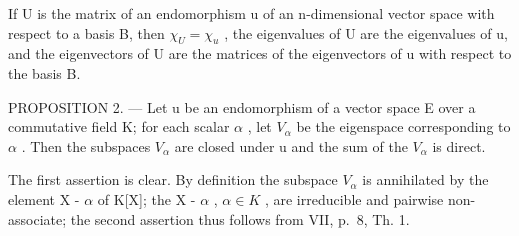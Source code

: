 If U is the matrix of an endomorphism u of an n-dimensional vector space with respect to a basis B, then \(\chi_{U} = \chi_{u}\) , the eigenvalues of U are the eigenvalues of u, and the eigenvectors of U are the matrices of the eigenvectors of u with respect to the basis B.

PROPOSITION 2. --- Let u be an endomorphism of a vector space E over a commutative field K; for each scalar \(\alpha\) , let \(V_{\alpha}\) be the eigenspace corresponding to \(\alpha\) . Then the subspaces \(V_{\alpha}\) are closed under u and the sum of the \(V_{\alpha}\) is direct.

The first assertion is clear. By definition the subspace \(V_{\alpha}\) is annihilated by the element X - \(\alpha\) of K{[}X{]}; the X - \(\alpha\) , \(\alpha \in K\) , are irreducible and pairwise non-associate; the second assertion thus follows from VII, p.~8, Th. 1.

